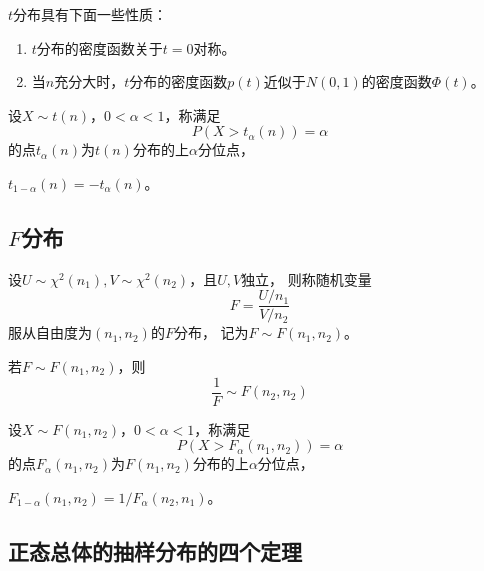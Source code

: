 \begin{theorem}[$t$分布的性质]
  $t$分布具有下面一些性质：
  \begin{enumerate}
    \item
    $t$分布的密度函数关于$t=0$对称。
    \item
    当$n$充分大时，$t$分布的密度函数$p(t)$近似于$N(0,1)$的密度函数$\Phi(t)$。
  \end{enumerate}
\end{theorem}

\begin{definition}
  设$X\sim t(n)$，$0<\alpha<1$，称满足
  \begin{displaymath}
    P(X>t_\alpha(n)) = \alpha
  \end{displaymath}
  的点$t_\alpha(n)$为$t(n)$分布的上$\alpha$分位点，
\end{definition}

\begin{theorem}
  $t_{1-\alpha}(n) = -t_\alpha(n)$。
\end{theorem}

\subsection{$F$分布}
\begin{definition}[$F$分布]
  设$U\sim\chi^2(n_1), V\sim\chi^2(n_2)$，且$U,V$独立，
  则称随机变量
  \begin{displaymath}
    F = \frac{U/n_1}{V/n_2}
  \end{displaymath}
  服从自由度为$(n_1,n_2)$的$F$分布，
  记为$F\sim F(n_1,n_2)$。
\end{definition}

\begin{theorem}[$F$分布的性质]
  若$F\sim F(n_1,n_2)$，则
  \begin{displaymath}
    \frac{1}{F} \sim F(n_2,n_2)
  \end{displaymath}
\end{theorem}

\begin{definition}
  设$X\sim F(n_1,n_2)$，$0<\alpha<1$，称满足
  \begin{displaymath}
    P(X>F_\alpha(n_1,n_2)) = \alpha
  \end{displaymath}
  的点$F_\alpha(n_1,n_2)$为$F(n_1,n_2)$分布的上$\alpha$分位点，
\end{definition}

\begin{theorem}
  $F_{1-\alpha}(n_1,n_2) = 1/F_\alpha(n_2,n_1)$。
\end{theorem}

\subsection{正态总体的抽样分布的四个定理}
